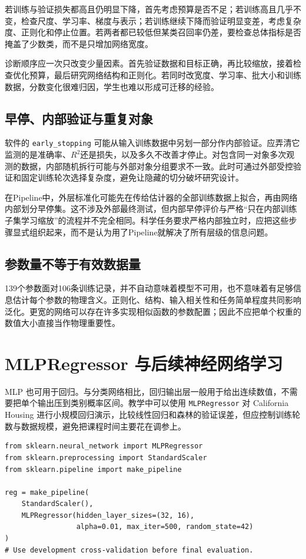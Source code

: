 若训练与验证损失都高且仍明显下降，首先考虑预算是否不足；若训练高且几乎不变，检查尺度、学习率、梯度与表示；若训练继续下降而验证明显变差，考虑复杂度、正则化和停止位置。若两者都已较低但某类召回率仍差，要检查总体指标是否掩盖了少数类，而不是只增加网络宽度。

诊断顺序应一次只改变少量因素。首先验证数据和目标正确，再比较缩放，接着检查优化预算，最后研究网络结构和正则化。若同时改宽度、学习率、批大小和训练数据，分数变化很难归因，学生也难以形成可迁移的经验。

\subsection{早停、内部验证与重复对象}
软件的 \texttt{early\_stopping} 可能从输入训练数据中另划一部分作内部验证。应弄清它监测的是准确率、$R^2$还是损失，以及多久不改善才停止。对包含同一对象多次观测的数据，内部随机拆行可能与外部对象分组要求不一致。此时可通过外部受控验证和固定训练轮次选择复杂度，避免让隐藏的切分破坏研究设计。

在Pipeline中，外层标准化可能先在传给估计器的全部训练数据上拟合，再由网络内部划分早停集。这不涉及外部最终测试，但内部早停评价与严格“只在内部训练子集学习缩放”的流程并不完全相同。科学任务要求严格内部独立时，应把这些步骤显式组织起来，而不是认为用了Pipeline就解决了所有层级的信息问题。

\subsection{参数量不等于有效数据量}
139个参数面对106条训练记录，并不自动意味着模型不可用，也不意味着有足够信息估计每个参数的物理含义。正则化、结构、输入相关性和任务简单程度共同影响泛化。更宽的网络可以存在许多实现相似函数的参数配置；因此不应把单个权重的数值大小直接当作物理重要性。

\section{MLPRegressor 与后续神经网络学习}
MLP 也可用于回归。与分类网络相比，回归输出层一般用于给出连续数值，不需要把单个输出压到类别概率区间。教学中可以使用 \texttt{MLPRegressor} 对 California Housing 进行小规模回归演示，比较线性回归和森林的验证误差，但应控制训练轮数与数据规模，避免把课程时间主要花在调参上。

\begin{lstlisting}[caption={回归 MLP 的基本流程，需使用第5章的住房数据}]
from sklearn.neural_network import MLPRegressor
from sklearn.preprocessing import StandardScaler
from sklearn.pipeline import make_pipeline

reg = make_pipeline(
    StandardScaler(),
    MLPRegressor(hidden_layer_sizes=(32, 16),
                 alpha=0.01, max_iter=500, random_state=42)
)
# Use development cross-validation before final evaluation.
\end{lstlisting}

